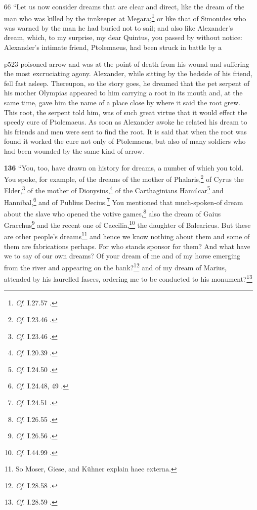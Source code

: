 66
``Let us now consider dreams that are clear and direct, like the dream of the man who was killed by the innkeeper at Megara;\texthebrew{}\footnote{\emph{Cf.}
I.27.57 .

} or like that of Simonides who was warned by the man he had buried not to sail; and also like Alexander's dream, which, to my surprise, my dear Quintus, you passed by without notice: Alexander's intimate friend, Ptolemaeus, had been struck in battle by a

p523 poisoned arrow and was at the point of death from his wound and suffering the most excruciating agony. Alexander, while sitting by the bedside of his friend, fell fast asleep. Thereupon, so the story goes, he dreamed that the pet serpent of his mother Olympias appeared to him carrying a root in its mouth and, at the same time, gave him the name of a place close by where it said the root grew. This root, the serpent told him, was of such great virtue that it would effect the speedy cure of Ptolemaeus. As soon as Alexander awoke he related his dream to his friends and men were sent to find the root. It is said that when the root was found it worked the cure not only of Ptolemaeus, but also of many soldiers who had been wounded by the same kind of arrow.

\textbf{136} ``You, too, have drawn on history for dreams, a number of which you told. You spoke, for example, of the dreams of the mother of Phalaris,\texthebrew{}\footnote{\emph{Cf.}
I.23.46 .

} of Cyrus the Elder,\texthebrew{}\footnote{\emph{Cf.}
I.23.46 .

} of the mother of Dionysius,\texthebrew{}\footnote{\emph{Cf.}
I.20.39 .

} of the Carthaginians Hamilcar\texthebrew{}\footnote{\emph{Cf.}
I.24.50 .

} and Hannibal,\texthebrew{}\footnote{\emph{Cf.}
I.24.48, 49 .

} and of Publius Decius.\texthebrew{}\footnote{\emph{Cf.}
I.24.51 .

} You mentioned that much-spoken\texthebrew{‑}of dream about the slave who opened the votive games,\texthebrew{}\footnote{\emph{Cf.}
I.26.55 .

} also the dream of Gaius Gracchus\texthebrew{}\footnote{\emph{Cf.}
I.26.56 .

} and the recent one of Caecilia,\texthebrew{}\footnote{\emph{Cf.}
I.44.99 .

} the daughter of Balearicus. But these are other people's dreams\texthebrew{}\footnote{So Moser, Giese, and Kühner explain haec externa.

} and hence we know nothing about them and some of them are fabrications perhaps. For who stands sponsor for them? And what have we to say of our own dreams? Of your dream of me and of my horse emerging from the river and appearing on the bank?\texthebrew{}\footnote{\emph{Cf.}
I.28.58 .

} and of my dream of Marius, attended by his laurelled fasces, ordering me to be conducted to his monument?\footnote{\emph{Cf.}
I.28.59 .

}

